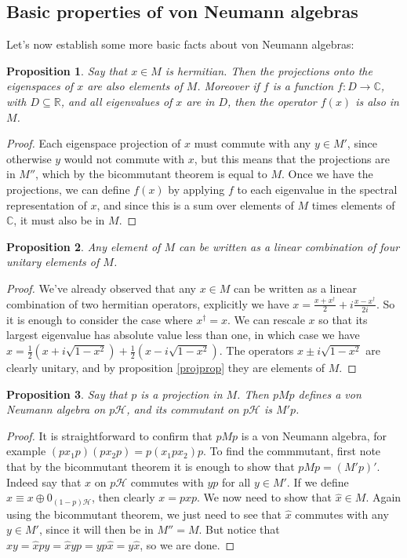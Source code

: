 \documentclass[12pt]{article}
\newcommand{\Hh}{\mathcal{H}}
\newtheorem{prop}{Proposition}[section]
\begin{document}
\subsection{Basic properties of von Neumann algebras}
Let's now establish some more basic facts about von Neumann algebras:
\begin{prop}\label{projprop}
Say that $x\in M$ is hermitian.  Then the projections onto the eigenspaces of $x$ are also elements of $M$.  Moreover if $f$ is a function $f:D \rightarrow\mathbb{C}$, with $D\subseteq \mathbb{R}$, and all eigenvalues of $x$ are in $D$, then the operator $f(x)$ is also in $M$.
\end{prop}
\begin{proof}
Each eigenspace projection of $x$ must commute with any $y\in M'$, since otherwise $y$ would not commute with $x$, but this means that the projections are in $M''$, which by the bicommutant theorem is equal to $M$.  Once we have the projections, we can define $f(x)$ by applying $f$ to each eigenvalue in the spectral representation of $x$, and since this is a sum over elements of $M$ times elements of $\mathbb{C}$, it must also be in $M$.
\end{proof}
\begin{prop}\label{uprop}
Any element of $M$ can be written as a linear combination of four unitary elements of $M$.
\end{prop}
\begin{proof}
We've already observed that any $x\in M$ can be written as a linear combination of two hermitian operators, explicitly we have $x=\frac{x+x^\dagger}{2}+i\frac{x-x^\dagger}{2i}$.  So it is enough to consider the case where $x^\dagger=x$.  We can rescale $x$ so that its largest eigenvalue has absolute value less than one, in which case we have $x=\frac{1}{2}\left(x+i\sqrt{1-x^2}\right)+\frac{1}{2}\left(x-i\sqrt{1-x^2}\right)$.  The operators $x\pm i \sqrt{1-x^2}$ are clearly unitary, and by proposition \eqref{projprop} they are elements of $M$.
\end{proof}
\begin{prop}
Say that $p$ is a projection in $M$.  Then $pMp$ defines a von Neumann algebra on $p\Hh$, and its commutant on $p\Hh$ is $M'p$.
\end{prop}
\begin{proof}
It is straightforward to confirm that $pMp$ is a von Neumann algebra, for example $(px_1p)(px_2p)=p(x_1 p x_2)p$.  To find the commmutant, first note that by the bicommutant theorem it is enough to show that $pMp=(M'p)'$.  Indeed say that $x$ on $p\Hh$ commutes with $yp$ for all $y\in M'$.  If we define $\hat{x}\equiv x\oplus 0_{(1-p)\Hh}$, then clearly $x=p\hat{x}p$.  We now need to show that $\hat{x}\in M$.  Again using the bicommutant theorem, we just need to see that $\hat{x}$ commutes with any $y\in M'$, since it will then be in $M''=M$.  But notice that $\hat{x}y=\hat{x}py=\hat{x}yp=yp\hat{x}=y\hat{x}$, so we are done.  
\end{proof}
\end{document}
